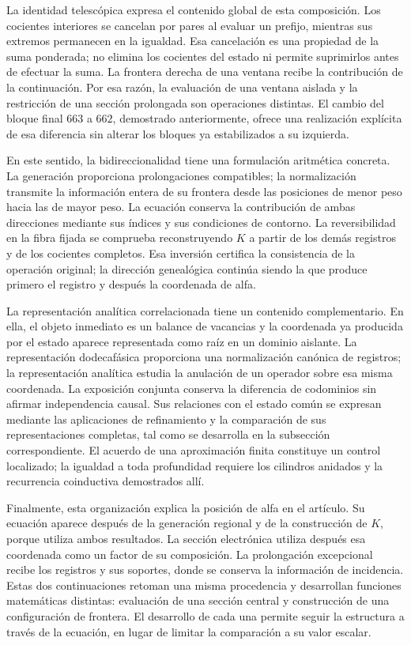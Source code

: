 La identidad telescópica expresa el contenido global de esta composición.
Los cocientes interiores se cancelan por pares al evaluar un prefijo,
mientras sus extremos permanecen en la igualdad. Esa cancelación es una
propiedad de la suma ponderada; no elimina los cocientes del estado ni
permite suprimirlos antes de efectuar la suma. La frontera derecha de una
ventana recibe la contribución de la continuación. Por esa razón, la
evaluación de una ventana aislada y la restricción de una sección
prolongada son operaciones distintas. El cambio del bloque final $663$ a
$662$, demostrado anteriormente, ofrece una realización explícita de esa
diferencia sin alterar los bloques ya estabilizados a su izquierda.

En este sentido, la bidireccionalidad tiene una formulación aritmética
concreta. La generación proporciona prolongaciones compatibles; la
normalización transmite la información entera de su frontera desde las
posiciones de menor peso hacia las de mayor peso. La ecuación conserva la
contribución de ambas direcciones mediante sus índices y sus condiciones
de contorno. La reversibilidad en la fibra fijada se comprueba reconstruyendo
$K$ a partir de los demás registros y de los cocientes completos. Esa
inversión certifica la consistencia de la operación original; la dirección
genealógica continúa siendo la que produce primero el registro y después
la coordenada de alfa.

La representación analítica correlacionada tiene un contenido complementario.
En ella, el objeto inmediato es un balance de vacancias y la coordenada ya
producida por el estado aparece representada como raíz en un dominio
aislante. La representación dodecafásica proporciona una normalización canónica
de registros; la representación analítica estudia la anulación de un
operador sobre esa misma coordenada. La exposición conjunta conserva la
diferencia de codominios sin afirmar independencia causal. Sus relaciones
con el estado común se expresan mediante las aplicaciones de refinamiento y
la comparación de sus representaciones completas, tal como se desarrolla en la
subsección correspondiente. El acuerdo de una aproximación finita constituye
un control localizado; la igualdad a toda profundidad requiere los cilindros
anidados y la recurrencia coinductiva demostrados allí.

Finalmente, esta organización explica la posición de alfa en el artículo.
Su ecuación aparece después de la generación regional y de la construcción
de $K$, porque utiliza ambos resultados. La sección electrónica utiliza
después esa coordenada como un factor de su composición. La prolongación
excepcional recibe los registros y sus soportes, donde se conserva la
información de incidencia. Estas dos continuaciones retoman una misma
procedencia y desarrollan funciones matemáticas distintas: evaluación de
una sección central y construcción de una configuración de frontera.
El desarrollo de cada una permite seguir la estructura a través de la
ecuación, en lugar de limitar la comparación a su valor escalar.
